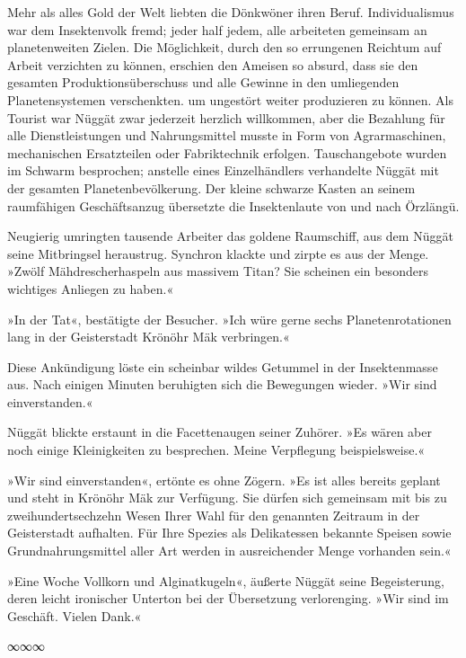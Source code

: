 Mehr als alles Gold der Welt liebten die Dönkwöner ihren Beruf. Individualismus war dem Insektenvolk fremd; jeder half jedem, alle arbeiteten gemeinsam an planetenweiten Zielen. Die Möglichkeit, durch den so errungenen Reichtum auf Arbeit verzichten zu können, erschien den Ameisen so absurd, dass sie den gesamten Produktionsüberschuss und alle Gewinne in den umliegenden Planetensystemen verschenkten. um ungestört weiter produzieren zu können. Als Tourist war Nüggät zwar jederzeit herzlich willkommen, aber die Bezahlung für alle Dienstleistungen und Nahrungsmittel musste in Form von Agrarmaschinen, mechanischen Ersatzteilen oder Fabriktechnik erfolgen. Tauschangebote wurden im Schwarm besprochen; anstelle eines Einzelhändlers verhandelte Nüggät mit der gesamten Planetenbevölkerung. Der kleine schwarze Kasten an seinem raumfähigen Geschäftsanzug übersetzte die Insektenlaute von und nach Örzlängü.

Neugierig umringten tausende Arbeiter das goldene Raumschiff, aus dem Nüggät seine Mitbringsel heraustrug. Synchron klackte und zirpte es aus der Menge. »Zwölf Mähdrescherhaspeln aus massivem Titan? Sie scheinen ein besonders wichtiges Anliegen zu haben.«

»In der Tat«, bestätigte der Besucher. »Ich würe gerne sechs Planetenrotationen lang in der Geisterstadt Krönöhr Mäk verbringen.«

Diese Ankündigung löste ein scheinbar wildes Getummel in der Insektenmasse aus. Nach einigen Minuten beruhigten sich die Bewegungen wieder. »Wir sind einverstanden.«

Nüggät blickte erstaunt in die Facettenaugen seiner Zuhörer. »Es wären aber noch einige Kleinigkeiten zu besprechen. Meine Verpflegung beispielsweise.«

»Wir sind einverstanden«, ertönte es ohne Zögern. »Es ist alles bereits geplant und steht in Krönöhr Mäk zur Verfügung. Sie dürfen sich gemeinsam mit bis zu zweihundertsechzehn Wesen Ihrer Wahl für den genannten Zeitraum in der Geisterstadt aufhalten. Für Ihre Spezies als Delikatessen bekannte Speisen sowie Grundnahrungsmittel aller Art werden in ausreichender Menge vorhanden sein.«

»Eine Woche Vollkorn und Alginatkugeln«, äußerte Nüggät seine Begeisterung, deren leicht ironischer Unterton bei der Übersetzung verlorenging. »Wir sind im Geschäft. Vielen Dank.«

\begin{center}
∞∞∞
\end{center}

